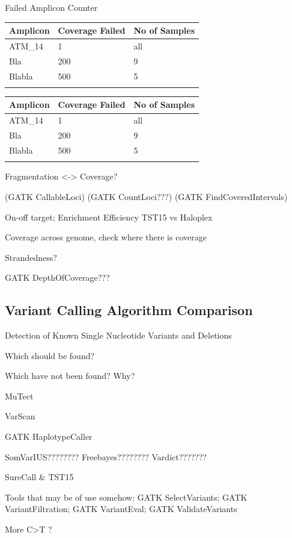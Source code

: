 


Failed Amplicon Counter

\begin{minipage}{0.5\textwidth}
\begin{tabular}{p{1.5cm} p{1.5cm} p{1.5cm}}\\
\hline
Amplicon & Coverage Failed & No of Samples \\
\hline
ATM_14 & 1 & all \\
Bla & 200 & 9 \\
Blabla & 500 & 5 \\
\label{failed_hpx}
\end{tabular}
\end{minipage}
\hfill
\begin{minipage}{0.5\textwidth}
\begin{tabular}{p{3cm} p{1.5cm} p{1.5cm}}\\
\hline
Amplicon & Coverage Failed & No of Samples \\
\hline
ATM_14 & 1 & all \\
Bla & 200 & 9 \\
Blabla & 500 & 5 \\
\label{failed_tst}
\end{tabular}
\end{minipage}

Fragmentation <-> Coverage?

(GATK CallableLoci)
(GATK CountLoci???)
(GATK FindCoveredIntervals)

On-off target; Enrichment Efficiency TST15 vs Haloplex

Coverage across genome, check where there is coverage

Strandedness?

GATK DepthOfCoverage???

\subsection{Variant Calling Algorithm Comparison}
Detection of Known Single Nucleotide Variants and Deletions

Which should be found?

Which have not been found? Why?

MuTect

VarScan

GATK HaplotypeCaller

SomVarIUS????????
Freebayes????????
Vardict???????

SureCall & TST15

Tools that may be of use somehow: GATK SelectVariants; GATK VariantFiltration; GATK VariantEval; GATK ValidateVariants

More C>T ?
